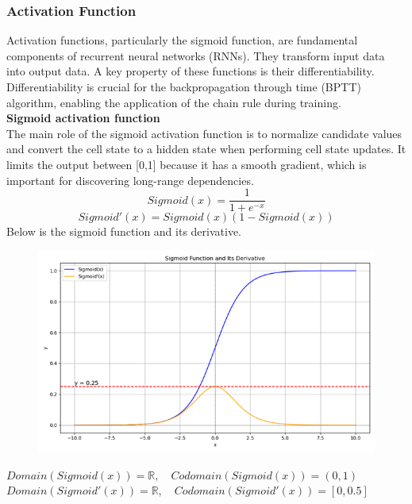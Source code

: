 \documentclass[12pt,a4paper]{article}
\begin{document}
\subsubsection{Activation Function}
Activation functions, particularly the sigmoid function, are fundamental components of recurrent neural networks (RNNs). They transform input data into output data. A key property of these functions is their differentiability. Differentiability is crucial for the backpropagation through time (BPTT) algorithm, enabling the application of the chain rule during training. \\[1ex]
\textbf{Sigmoid activation function}
\\[1ex]
The main role of the sigmoid activation function is to normalize candidate values and convert the cell state to a hidden state when performing cell state updates. It limits the output between [0,1] because it has a smooth gradient, which is important for discovering long-range dependencies.\\[1ex]
\begin{equation}
    Sigmoid(x) = \frac{ 1 }{ 1+e^{-x} }
\end{equation}
\begin{equation}
    Sigmoid'(x) = Sigmoid(x)(1-Sigmoid(x))
\end{equation}
Below is the sigmoid function and its derivative.
\begin{figure}[!htb]
    \centering
    \includegraphics[width=1\textwidth]{../Pic/sigmoid.png} %
    \label{fig:sigmoid}
\end{figure}
\newline
$Domain(Sigmoid(x))=\mathbb{R},\hspace{1em} Codomain(Sigmoid(x))=(0,1)$\\
$Domain(Sigmoid'(x))=\mathbb{R},\hspace{1em} Codomain(Sigmoid'(x))=[0,0.5]$
\end{document}
